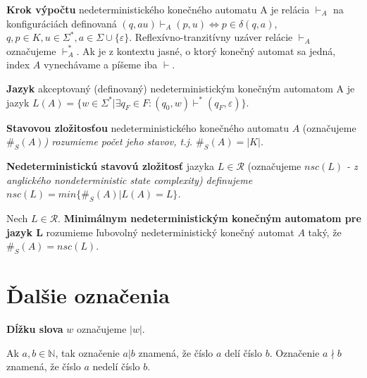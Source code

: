 \begin{definition}
\textbf{Krok výpočtu} nedeterministického konečného automatu A je relácia $ \vdash_A $ na konfiguráciách definovaná $ (q, au) \vdash_{A} (p,u) \Leftrightarrow p \in \delta(q,a) $, $q,p \in K, u \in \Sigma^*, a \in \Sigma \cup \lbrace \varepsilon \rbrace $. Reflexívno-tranzitívny uzáver relácie $ \vdash_A $ označujeme $ \vdash_{A}^{*} $. Ak je z kontextu jasné, o ktorý konečný automat sa jedná, index $ A $ vynechávame a píšeme iba $ \vdash $.
\end{definition}

\begin{definition}
\textbf{Jazyk} akceptovaný (definovaný) nedeterministickým konečným automatom A je jazyk $ L(A) = \lbrace w \in \Sigma^{*} | \exists q_F \in F: (q_0,w) \vdash^{*} (q_F, \varepsilon) \rbrace $.
\end{definition}

\begin{definition}
\textbf{Stavovou zložitosťou} nedeterministického konečného automatu $ A $ (označujeme \em{}$ \#_S(A) $\em{}) rozumieme počet jeho stavov, t.j. \em{}$ \#_S(A) = |K| $\em{}.
\end{definition}

\begin{definition}
\textbf{Nedeterministickú stavovú zložitosť} jazyka $ L \in \mathscr{R} $ (označujeme \em{}$ nsc(L) $\em{} - z anglického nondeterministic state complexity) definujeme \em{}$ nsc(L)=min \lbrace \#_S(A) | L(A)=L \rbrace $\em{}.
\end{definition}

\begin{definition}
Nech $ L \in \mathscr{R} $. \textbf{Minimálnym nedeterministickým konečným automatom pre jazyk L} rozumieme ľubovolný nedeterministický konečný automat $ A $ taký, že $ \#_S(A)=nsc(L) $.
\end{definition}

\section{Ďalšie označenia}

\begin{notation}
\textbf{Dĺžku slova} $ w $ označujeme $ |w| $.
\end{notation}

\begin{notation}
Ak $ a,b \in \mathbb{N} $, tak označenie $ a|b $ znamená, že číslo $ a $ delí číslo $ b $. Označenie $ a \nmid b $ znamená, že číslo $ a $ nedelí číslo $ b $.
\end{notation}

